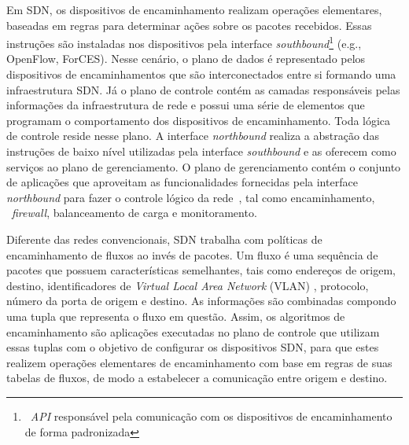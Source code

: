 Em SDN, os dispositivos de encaminhamento realizam operações elementares, baseadas em regras para determinar ações sobre os pacotes recebidos. 
Essas instruções são instaladas nos dispositivos pela interface \emph{southbound}\footnote[1]{~\textit{API} responsável pela comunicação com os dispositivos de encaminhamento de forma padronizada} (e.g., OpenFlow, ForCES).
Nesse cenário, o plano de dados é representado pelos dispositivos de encaminhamentos que são interconectados entre si formando uma infraestrutura SDN. 
Já o plano de controle contém as camadas responsáveis pelas informações da infraestrutura de rede e possui uma série de elementos que programam o comportamento dos dispositivos de encaminhamento. Toda lógica de controle reside nesse plano. A interface \emph{northbound} realiza a abstração das instruções de baixo nível utilizadas pela interface \emph{southbound} e as oferecem como serviços ao plano de gerenciamento. O plano de gerenciamento contém o conjunto de aplicações que aproveitam as funcionalidades fornecidas pela interface \emph{northbound} para fazer o controle lógico da rede~\cite{kreutz2015}, tal como encaminhamento, ~\emph{firewall}, balanceamento de carga e monitoramento.


Diferente das redes convencionais, SDN trabalha com políticas de encaminhamento de fluxos ao invés de pacotes. Um fluxo é uma sequência de pacotes que possuem características semelhantes, tais como endereços de origem, destino, identificadores de \emph{Virtual Local Area Network} (VLAN) , protocolo, número da porta de origem e destino. 
As informações são combinadas compondo uma tupla que representa o fluxo em questão.
Assim, os algoritmos de encaminhamento são aplicações executadas no plano de controle que utilizam essas tuplas com o objetivo de configurar os dispositivos SDN, para que estes realizem operações elementares de encaminhamento com base em regras de suas tabelas de fluxos, de modo a estabelecer a comunicação entre origem e destino. 

